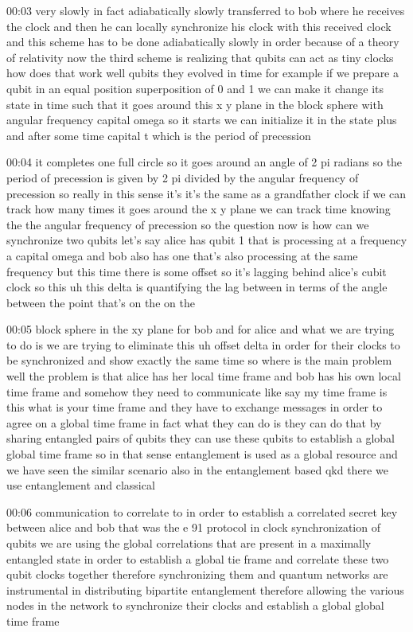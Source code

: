 00:03
very slowly in fact adiabatically slowly
transferred to bob where he receives the clock and then he can locally
synchronize his clock with this received clock and this scheme has to be done
adiabatically slowly in order because of a theory of relativity
now the third scheme is realizing that qubits can act as
tiny clocks how does that work well qubits they evolved in time
for example if we prepare a qubit in an equal position superposition of 0 and 1
we can make it change its state in time such that it goes around this
x y plane in the block sphere with angular frequency capital omega
so it starts we can initialize it in the state plus
and after some time capital t which is the period of precession

00:04
it completes one full circle so it goes around an angle of 2 pi
radians so the period of precession is given by 2 pi
divided by the angular frequency of precession
so really in this sense it's it's the same as a grandfather clock
if we can track how many times it goes around the x y plane
we can track time knowing the the angular frequency of precession
so the question now is how can we synchronize two qubits
let's say alice has qubit 1 that is processing at a frequency a capital omega
and bob also has one that's also processing at the same frequency
but this time there is some offset so it's lagging behind alice's
cubit clock so this uh this delta is quantifying
the lag between in terms of the angle between the point that's on the on the

00:05
block sphere in the xy plane for bob and for
alice and what we are trying to do is we are trying to eliminate
this uh offset delta in order for their clocks to be synchronized and show
exactly the same time so where is the main problem well the
problem is that alice has her local time frame and bob has his
own local time frame and somehow they need to communicate like say my time
frame is this what is your time frame and they have to
exchange messages in order to agree on a global time frame
in fact what they can do is they can do that by sharing
entangled pairs of qubits they can use these qubits
to establish a global global time frame so in that sense entanglement is used as
a global resource and we have seen the similar scenario
also in the entanglement based qkd there we use entanglement and classical

00:06
communication to correlate to in order to establish a correlated secret key
between alice and bob that was the e 91 protocol
in clock synchronization of qubits we are using
the global correlations that are present in a maximally entangled state
in order to establish a global tie frame and correlate
these two qubit clocks together therefore synchronizing them
and quantum networks are instrumental in distributing bipartite entanglement
therefore allowing the various nodes in the network to
synchronize their clocks and establish a global global time frame

